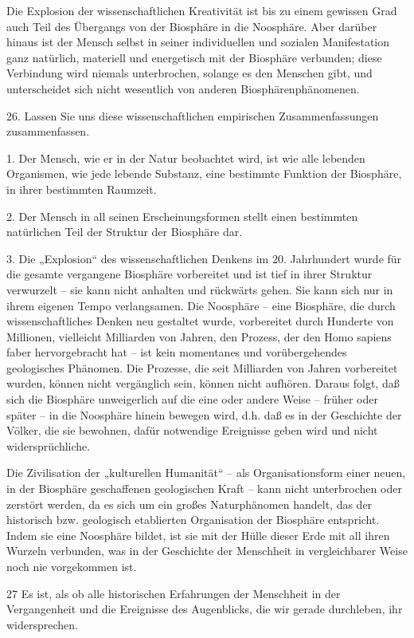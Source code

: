 \documentclass[11pt,a4paper]{book}
\begin{document}
Die Explosion der wissenschaftlichen Kreativität ist bis zu einem gewissen Grad auch Teil des Übergangs von der Biosphäre in die Noosphäre. Aber darüber hinaus ist der Mensch selbst in seiner individuellen und sozialen Manifestation ganz natürlich, materiell und energetisch mit der Biosphäre verbunden; diese Verbindung wird niemals unterbrochen, solange es den Menschen gibt, und unterscheidet sich nicht wesentlich von anderen Biosphärenphänomenen. 

26. Lassen Sie uns diese wissenschaftlichen empirischen Zusammenfassungen zusammenfassen. 

    1. Der Mensch, wie er in der Natur beobachtet wird, ist wie alle lebenden Organismen, wie jede lebende Substanz, eine bestimmte Funktion der Biosphäre, in ihrer bestimmten Raumzeit. 

    2. Der Mensch in all seinen Erscheinungsformen stellt einen bestimmten natürlichen Teil der Struktur der Biosphäre dar. 

    3. Die „Explosion“ des wissenschaftlichen Denkens im 20. Jahrhundert wurde für die gesamte vergangene Biosphäre vorbereitet und ist tief in ihrer Struktur verwurzelt -- sie kann nicht anhalten und rückwärts gehen. Sie kann sich nur in ihrem eigenen Tempo verlangsamen. Die Noosphäre -- eine Biosphäre, die durch wissenschaftliches Denken neu gestaltet wurde, vorbereitet durch Hunderte von Millionen, vielleicht Milliarden von Jahren, den Prozess, der den Homo sapiens faber hervorgebracht hat -- ist kein momentanes und vorübergehendes geologisches Phänomen. Die Prozesse, die seit Milliarden von Jahren vorbereitet wurden, können nicht vergänglich sein, können nicht aufhören. Daraus folgt, daß sich die Biosphäre unweigerlich auf die eine oder andere Weise -- früher oder später -- in die Noosphäre hinein bewegen wird, d.h. daß es in der Geschichte der Völker, die sie bewohnen, dafür notwendige Ereignisse geben wird und nicht widersprüchliche. 

Die Zivilisation der „kulturellen Humanität“ -- als Organisationsform einer neuen, in der Biosphäre geschaffenen geologischen Kraft -- kann nicht unterbrochen oder zerstört werden, da es sich um ein großes Naturphänomen handelt, das der historisch bzw. geologisch etablierten Organisation der Biosphäre entspricht. Indem sie eine Noosphäre bildet, ist sie mit der Hülle dieser Erde mit all ihren Wurzeln verbunden, was in der Geschichte der Menschheit in vergleichbarer Weise noch nie vorgekommen ist. 

27 Es ist, als ob alle historischen Erfahrungen der Menschheit in der Vergangenheit und die Ereignisse des Augenblicks, die wir gerade durchleben, ihr widersprechen. 
\end{document}
